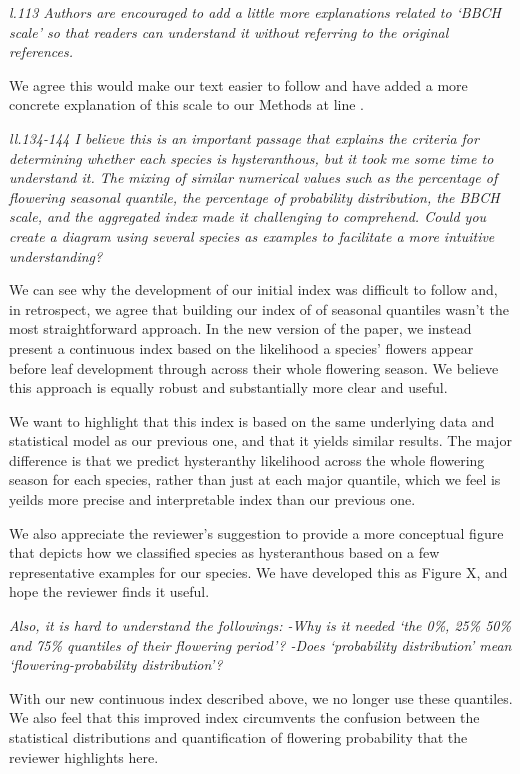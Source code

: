 \documentclass{article}[12pt]
\begin{document}
\emph{l.113 Authors are encouraged to add a little more explanations related to ‘BBCH scale’ so that readers can understand it without referring to the original references.}

We agree this would make our text easier to follow and have added a more concrete explanation of this scale to our Methods at line  .

\emph{ll.134-144 I believe this is an important passage that explains the criteria for determining whether each species is hysteranthous, but it took me some time to understand it. The mixing of similar numerical values such as the percentage of flowering seasonal quantile, the percentage of probability distribution, the BBCH scale, and the aggregated index made it challenging to comprehend. Could you create a diagram using several species as examples to facilitate a more intuitive understanding?}

We can see why the development of our initial index was difficult to follow and, in retrospect, we agree that building our index of of seasonal quantiles wasn't the most straightforward approach.  In the new version of the paper, we instead present a continuous index based on the likelihood a species' flowers appear before leaf development through across their whole flowering season. We believe this approach is equally robust and substantially more clear and useful. 

We want to highlight that this index is based on the same underlying data and statistical model as our previous one, and that it yields similar results. The major difference is that we predict hysteranthy likelihood across the whole flowering season for each species, rather than just at each major quantile, which we feel is yeilds more precise and interpretable index than our previous one.

We also appreciate the reviewer's suggestion to provide a more conceptual figure that depicts how we classified species as hysteranthous based on a few representative examples for our species. We have developed this as Figure X, and hope the reviewer finds it useful.

\emph{Also, it is hard to understand the followings:
-Why is it needed ‘the 0\%, 25\% 50\% and 75\% quantiles of their flowering period’?
-Does ‘probability distribution’ mean ‘flowering-probability distribution’?}

With our new continuous index described above, we no longer use these quantiles. We also feel that this improved index circumvents the confusion between the statistical distributions and quantification of flowering probability that the reviewer highlights here. 
\end{document}
